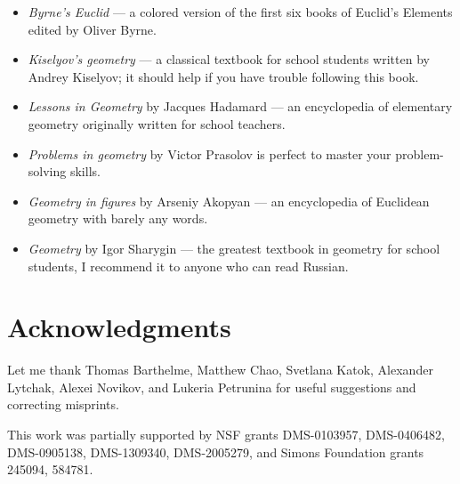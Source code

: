 \begin{itemize}
\item \emph{Byrne's Euclid} \cite{byrne} --- a colored version of the first six books of Euclid's Elements edited by Oliver Byrne. 

\item \emph{Kiselyov's geometry} \cite{kiselev} ---
a classical textbook for school students written by Andrey Kiselyov; it should help if you have trouble following this book.

\item \emph{Lessons in Geometry} by Jacques Hadamard \cite{hadamard} --- an encyclopedia of elementary geometry originally written for school teachers.



\item \emph{Problems in geometry} by Victor Prasolov\cite{prasolov}  is perfect to master your problem-solving skills.

\item \emph{Geometry in figures} by Arseniy Akopyan \cite{akopyan} --- an encyclopedia of Euclidean geometry with barely any words.

\item \emph{Geometry} by Igor Sharygin \cite{sharygin} --- the greatest textbook in geometry for school students, I recommend it to anyone who can read Russian.

\end{itemize}

\section{Acknowledgments}

{\sloppy

Let me thank 
Thomas Barthelme,
Matthew Chao, 
Svetlana Katok, 
Alexander Lytchak,
Alexei Novikov,
and Lukeria Petrunina
for useful suggestions and correcting misprints.

This work was partially supported by
NSF grants
DMS-0103957,
DMS-0406482,
DMS-0905138,
DMS-1309340,
DMS-2005279,
and Simons Foundation grants 
245094, 584781.

}
